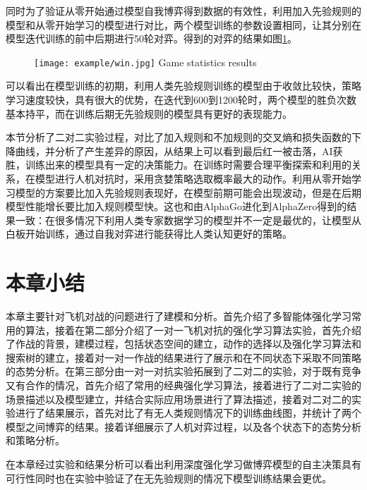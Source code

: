 同时为了验证从零开始通过模型自我博弈得到数据的有效性，利用加入先验规则的模型和从零开始学习的模型进行对比，两个模型训练的参数设置相同，让其分别在模型迭代训练的前中后期进行50轮对弈。得到的对弈的结果如图\ref{fig:win}。

\begin{figure}[hbtp]
	\centering
	\texttt{[image: example/win.jpg]}
	{Game statistics results}
	\label{fig:win}
\end{figure}

可以看出在模型训练的初期，利用人类先验规则训练的模型由于收敛比较快，策略学习速度较快，具有很大的优势，在迭代到600到1200轮时，两个模型的胜负次数基本持平，而在训练后期无先验规则的模型具有更好的表现能力。

本节分析了二对二实验过程，对比了加入规则和不加规则的交叉熵和损失函数的下降曲线，并分析了产生差异的原因，从结果上可以看到最后红一被击落，AI获胜，训练出来的模型具有一定的决策能力。在训练时需要合理平衡探索和利用的关系，在模型进行人机对抗时，采用贪婪策略选取概率最大的动作。利用从零开始学习模型的方案要比加入先验规则表现好，在模型前期可能会出现波动，但是在后期模型性能增长要比加入规则模型快。这也和由AlphaGo进化到AlphaZero得到的结果一致：在很多情况下利用人类专家数据学习的模型并不一定是最优的，让模型从白板开始训练，通过自我对弈进行能获得比人类认知更好的策略。

\section{本章小结}
本章主要针对飞机对战的问题进行了建模和分析。首先介绍了多智能体强化学习常用的算法，接着在第二部分介绍了一对一飞机对抗的强化学习算法实验，首先介绍了作战的背景，建模过程，包括状态空间的建立，动作的选择以及强化学习算法和搜索树的建立，接着对一对一作战的结果进行了展示和在不同状态下采取不同策略的态势分析。在第三部分由一对一对抗实验拓展到了二对二的实验，对于既有竞争又有合作的情况，首先介绍了常用的经典强化学习算法，接着进行了二对二实验的场景描述以及模型建立，并结合实际应用场景进行了算法描述，接着对二对二的实验进行了结果展示，首先对比了有无人类规则情况下的训练曲线图，并统计了两个模型之间博弈的结果。接着详细展示了人机对弈过程，以及各个状态下的态势分析和策略分析。

在本章经过实验和结果分析可以看出利用深度强化学习做博弈模型的自主决策具有可行性同时也在实验中验证了在无先验规则的情况下模型训练结果会更优。

